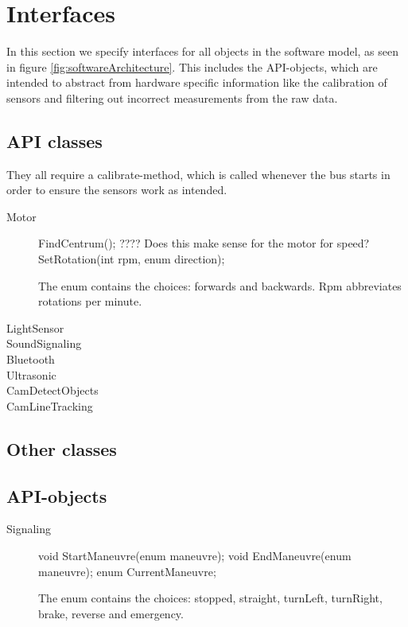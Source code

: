 \section{Interfaces}
In this section we specify interfaces for all objects in the software model, as seen in figure \ref{fig:softwareArchitecture}. This includes the API-objects, which are intended to abstract from hardware specific  information like the calibration of sensors and filtering out incorrect measurements from the raw data. 


\subsection{API classes}
They all require a calibrate-method, which is called whenever the bus starts in order to ensure the sensors work as intended. 


\begin{description}
    \item [Motor]
    FindCentrum(); ???? Does this make sense for the motor for speed?
    SetRotation(int rpm, enum direction);
    
    
    The enum contains the choices: forwards and backwards. Rpm abbreviates rotations per minute.
    
    \item [LightSensor]
    \item [SoundSignaling]
    \item [Bluetooth]
    \item [Ultrasonic]
    \item [CamDetectObjects]
    \item [CamLineTracking]
\end{description}

\subsection{Other classes}
\subsection{API-objects}
\begin{description}
    \item [Signaling]
    void StartManeuvre(enum maneuvre);
    void EndManeuvre(enum maneuvre);
    enum CurrentManeuvre;
    
    The enum contains the choices: stopped, straight, turnLeft, turnRight, brake, reverse and emergency. 
\end{description}

